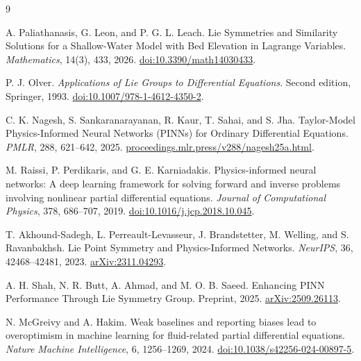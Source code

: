 \begin{thebibliography}{9}
\raggedright
\setlength{\itemsep}{3pt}
\setlength{\parskip}{0pt}
A. Paliathanasis, G. Leon, and P. G. L. Leach.
Lie Symmetries and Similarity Solutions for a Shallow-Water Model with Bed Elevation in Lagrange Variables.
\emph{Mathematics}, 14(3), 433, 2026.
\href{https://doi.org/10.3390/math14030433}{doi:10.3390/math14030433}.

P. J. Olver. \emph{Applications of Lie Groups to Differential Equations}.
Second edition, Springer, 1993.
\href{https://doi.org/10.1007/978-1-4612-4350-2}{doi:10.1007/978-1-4612-4350-2}.

C. K. Nagesh, S. Sankaranarayanan, R. Kaur, T. Sahai, and S. Jha.
Taylor-Model Physics-Informed Neural Networks (PINNs) for Ordinary Differential Equations.
\emph{PMLR}, 288, 621--642, 2025.
\href{https://proceedings.mlr.press/v288/nagesh25a.html}{proceedings.mlr.press/v288/nagesh25a.html}.

M. Raissi, P. Perdikaris, and G. E. Karniadakis.
Physics-informed neural networks: A deep learning framework for solving forward and inverse problems involving nonlinear partial differential equations.
\emph{Journal of Computational Physics}, 378, 686--707, 2019.
\href{https://doi.org/10.1016/j.jcp.2018.10.045}{doi:10.1016/j.jcp.2018.10.045}.

T. Akhound-Sadegh, L. Perreault-Levasseur, J. Brandstetter, M. Welling, and S. Ravanbakhsh.
Lie Point Symmetry and Physics-Informed Networks.
\emph{NeurIPS}, 36, 42468--42481, 2023.
\href{https://arxiv.org/abs/2311.04293}{arXiv:2311.04293}.

A. H. Shah, N. R. Butt, A. Ahmad, and M. O. B. Saeed.
Enhancing PINN Performance Through Lie Symmetry Group.
Preprint, 2025.
\href{https://arxiv.org/abs/2509.26113}{arXiv:2509.26113}.

N. McGreivy and A. Hakim.
Weak baselines and reporting biases lead to overoptimism in machine learning for fluid-related partial differential equations.
\emph{Nature Machine Intelligence}, 6, 1256--1269, 2024.
\href{https://doi.org/10.1038/s42256-024-00897-5}{doi:10.1038/s42256-024-00897-5}.
\ifdefined\SVEContextReferences\SVEContextReferences\fi
\end{thebibliography}
